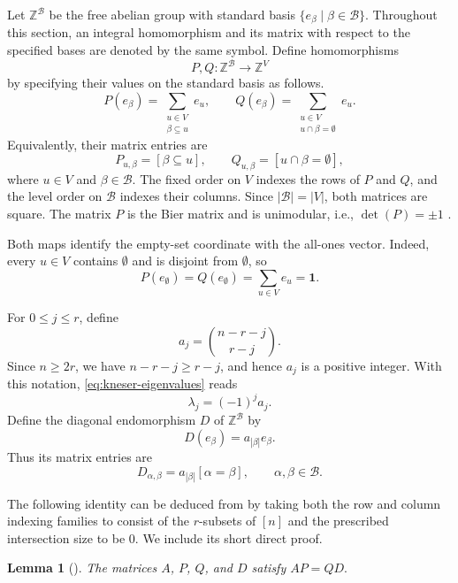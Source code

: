 \documentclass[11pt,reqno]{amsart}
\theoremstyle{plain}
\newtheorem{lemma}[theorem]{Lemma}
\theoremstyle{definition}
\theoremstyle{remark}
\begin{document}
Let $\mathbb Z^{\mathcal B}$ be the free abelian group with standard basis
$\{e_\beta\mid\beta\in\mathcal B\}$. Throughout this section, an integral
homomorphism and its matrix with respect to the specified bases are denoted by
the same symbol. Define homomorphisms
\[
  P,Q\colon
  \mathbb Z^{\mathcal B}\longrightarrow\mathbb Z^V
\]
by specifying their values on the standard basis as follows.
\[
  P(e_\beta)
  =\sum_{\substack{u\in V\\\beta\subseteq u}}e_u,
  \qquad
  Q(e_\beta)
  =\sum_{\substack{u\in V\\u\cap\beta=\emptyset}}e_u.
\]
Equivalently, their matrix entries are
\[
  P_{u,\beta}=[\beta\subseteq u],
  \qquad
  Q_{u,\beta}=[u\cap\beta=\emptyset],
\]
where $u\in V$ and $\beta\in\mathcal B$. The fixed order on $V$ indexes the
rows of $P$ and $Q$, and the level order on $\mathcal B$ indexes their columns.
Since $|\mathcal B|=|V|$, both matrices are square. The matrix $P$ is the Bier
matrix and is unimodular, i.e., $\det(P)=\pm1$ \cite{Bie93}.

Both maps identify the empty-set coordinate with the
all-ones vector. Indeed,
every $u\in V$ contains $\emptyset$ and is disjoint from $\emptyset$, so
\begin{equation}\label{eq:emptyset-column}
  P(e_{\emptyset})
  =Q(e_{\emptyset})
  =\sum_{u\in V}e_u
  =\mathbf1.
\end{equation}

For $0\le j\le r$, define
\[
  a_j=\binom{n-r-j}{r-j}.
\]
Since $n\ge2r$, we have $n-r-j\ge r-j$, and hence $a_j$ is a positive integer.
With this notation, \eqref{eq:kneser-eigenvalues} reads
\[
  \lambda_j=(-1)^j a_j.
\]
Define the diagonal endomorphism $D$ of $\mathbb Z^{\mathcal B}$ by
\[
  D(e_\beta)=a_{|\beta|}e_\beta.
\]
Thus its matrix entries are
\[
  D_{\alpha,\beta}=a_{|\beta|}[\alpha=\beta],
  \qquad \alpha,\beta\in\mathcal B.
\]

The following identity can be deduced from \cite[Lemma~1.5]{DEGJPP25} by taking
both the row and column indexing families to consist of the $r$-subsets of
$[n]$ and the prescribed intersection size to be $0$. We include its short
direct proof.

\begin{lemma}[\cite{DEGJPP25}]\label{lem:bier-factor}
The matrices $A$, $P$, $Q$, and $D$ satisfy
$AP=QD.$
\end{lemma}
\end{document}
